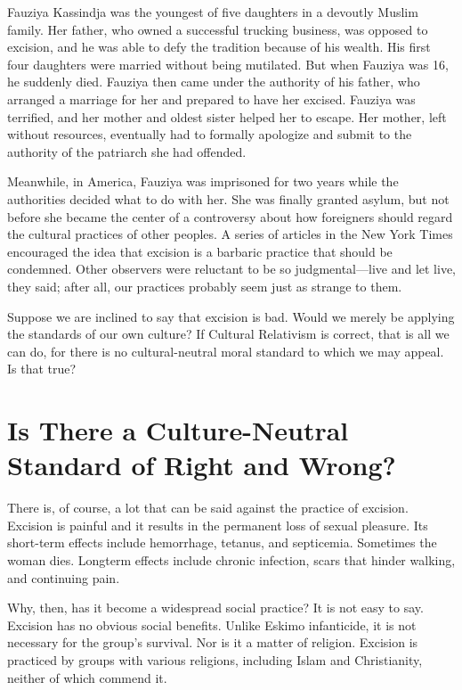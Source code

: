 Fauziya  Kassindja  was  the  youngest  of  five  daughters  in  a  devoutly 
Muslim  family.  Her  father,  who  owned  a  successful  trucking  business, 
was opposed to excision, and he was able to defy the tradition because 
of his wealth. His first four daughters were married without being 
mutilated.  But  when  Fauziya  was  16,  he  suddenly  died.  Fauziya  then 
came under the authority of his father, who arranged a marriage for her 
and prepared to have her excised. Fauziya was terrified, and her mother 
and oldest sister helped her to escape. Her mother, left without 
resources, eventually had to formally apologize and submit to the 
authority of the patriarch she had offended. 

Meanwhile, in America, Fauziya was imprisoned for  two years while the 
authorities decided what to do with her. She was finally granted asylum, 
but  not  before  she  became  the  center  of  a  controversy  about  how 
foreigners should regard the cultural practices of other peoples. A series 
of articles in the New York Times encouraged the idea that excision is a 
barbaric  practice  that  should  be  condemned.  Other  observers  were 
reluctant  to  be  so  judgmental—live  and  let  live,  they  said;  after  all,  our 
practices probably seem just as strange to them. 

Suppose we are inclined to say that excision is bad. Would we merely be 
applying  the  standards  of  our  own  culture?  If  Cultural  Relativism  is 
correct,  that  is  all  we  can  do,  for  there  is  no  cultural-neutral  moral 
standard to which we may appeal. Is that true? 

\section{Is There a Culture-Neutral Standard of Right and Wrong?} 
There  is,  of  course,  a  lot  that  can  be  said  against  the  practice  of 
excision. Excision is painful and it results in the permanent loss of sexual 
pleasure. Its short-term effects include hemorrhage, tetanus, and 
septicemia. Sometimes the woman dies. Longterm effects include 
chronic infection, scars that hinder walking, and continuing pain. 

Why, then, has it become a widespread social practice? It is not easy to 
say. Excision has no obvious social benefits. Unlike Eskimo infanticide, it 
is  not  necessary  for  the  group's  survival.  Nor  is  it  a  matter  of  religion. 
Excision  is  practiced  by  groups  with  various  religions,  including  Islam 
and Christianity, neither of which commend it. 

